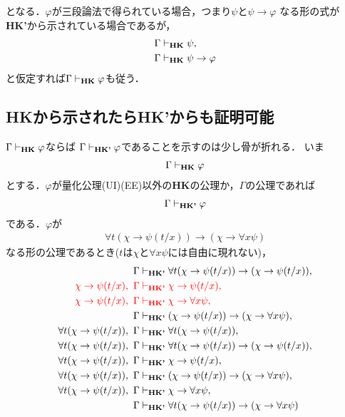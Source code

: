 	となる．$\varphi$が三段論法で得られている場合，つまり$\psi$と$\psi \rightarrow \varphi$
	なる形の式が{\bf HK'}から示されている場合であるが，
	\begin{align}
		\Gamma &\vdash_{{\scriptsize \mbox{{\bf HK}}}} \psi, \\
		\Gamma &\vdash_{{\scriptsize \mbox{{\bf HK}}}} \psi \rightarrow \varphi
	\end{align}
	と仮定すれば$\Gamma \vdash_{{\scriptsize \mbox{{\bf HK}}}} \varphi$も従う．
	
\subsection{{\bf HK}から示されたら{\bf HK'}からも証明可能}
	$\Gamma \vdash_{{\scriptsize \mbox{{\bf HK}}}} \varphi$ならば
	$\Gamma \vdash_{{\scriptsize \mbox{{\bf HK'}}}} \varphi$であることを示すのは少し骨が折れる．
	いま
	\begin{align}
		\Gamma \vdash_{{\scriptsize \mbox{{\bf HK}}}} \varphi
	\end{align}
	とする．$\varphi$が量化公理(UI)(EE)以外の{\bf HK}の公理か，$\Gamma$の公理であれば
	\begin{align}
		\Gamma \vdash_{{\scriptsize \mbox{{\bf HK'}}}} \varphi
	\end{align}
	である．$\varphi$が
	\begin{align}
		\forall t (\chi \rightarrow \psi(t/x)) 
		\rightarrow (\chi \rightarrow \forall x \psi)
	\end{align}
	なる形の公理であるとき($t$は$\chi$と$\forall x \psi$には自由に現れない)，
	\begin{align}
		\Gamma &\vdash_{{\scriptsize \mbox{{\bf HK'}}}} 
			\forall t (\chi \rightarrow \psi(t/x)) 
			\rightarrow (\chi \rightarrow \psi(t/x)), \\
		\color{red}\chi \rightarrow \psi(t/x),\ \Gamma &
		\color{red}\vdash_{{\scriptsize \mbox{{\bf HK'}}}}
			\chi \rightarrow \psi(t/x), \\
		\color{red}\chi \rightarrow \psi(t/x),\ \Gamma &
		\color{red}\vdash_{{\scriptsize \mbox{{\bf HK'}}}}
			\chi \rightarrow \forall x \psi, \\
		\Gamma &\vdash_{{\scriptsize \mbox{{\bf HK'}}}} (\chi \rightarrow \psi(t/x)) 
			\rightarrow (\chi \rightarrow \forall x \psi), \\
		\forall t (\chi \rightarrow \psi(t/x)),\ \Gamma
			&\vdash_{{\scriptsize \mbox{{\bf HK'}}}} \forall t (\chi \rightarrow \psi(t/x)), \\
		\forall t (\chi \rightarrow \psi(t/x)),\ \Gamma
			&\vdash_{{\scriptsize \mbox{{\bf HK'}}}} \forall t (\chi \rightarrow \psi(t/x)) 
			\rightarrow (\chi \rightarrow \psi(t/x)), \\
		\forall t (\chi \rightarrow \psi(t/x)),\ \Gamma
			&\vdash_{{\scriptsize \mbox{{\bf HK'}}}} \chi \rightarrow \psi(t/x), \\
		\forall t (\chi \rightarrow \psi(t/x)),\ \Gamma
			&\vdash_{{\scriptsize \mbox{{\bf HK'}}}} (\chi \rightarrow \psi(t/x)) 
			\rightarrow (\chi \rightarrow \forall x \psi), \\
		\forall t (\chi \rightarrow \psi(t/x)),\ \Gamma
			&\vdash_{{\scriptsize \mbox{{\bf HK'}}}} \chi \rightarrow \forall x \psi, \\
		\Gamma &\vdash_{{\scriptsize \mbox{{\bf HK'}}}} \forall t (\chi \rightarrow \psi(t/x)) 
			\rightarrow (\chi \rightarrow \forall x \psi)
	\end{align}
